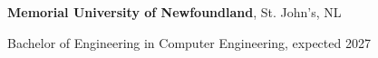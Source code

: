 \textbf{Memorial University of Newfoundland}, St. John's, NL\par
Bachelor of Engineering in Computer Engineering, expected 2027\par
